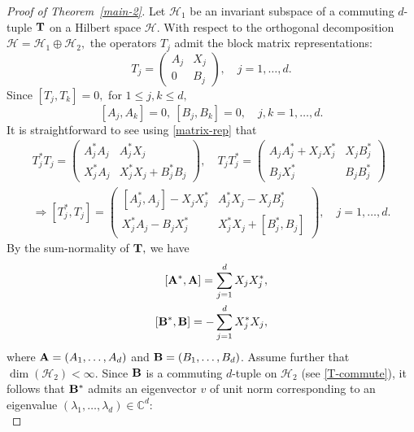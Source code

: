 \documentclass[10pt, a4paper, oneside, reqno]{amsproc}
\numberwithin{equation}{section}
\theoremstyle{remark}
\theoremstyle{definition}
\newcommand*{\Le}{\leqslant}
\begin{document}
\begin{proof}[Proof of Theorem~\ref{main-2}]
Let $\mathcal H_1$ be an invariant subspace of a commuting $d$-tuple ${\bf T}$ on a Hilbert space $\mathcal H$. With respect to the orthogonal decomposition $\mathcal H= \mathcal H_1 \oplus \mathcal H_2,$ the operators $T_j$ admit the block matrix representations: 
\begin{equation} \label{matrix-rep}
T_j=\begin{pmatrix}
A_j & X_j \\
0 & B_j
\end{pmatrix}, \quad j=1,\ldots,d.
\end{equation}
Since $[T_j, T_k]=0,$ for $1 \Le j, k \Le d,$ 
\begin{equation} \label{T-commute}
[A_j, A_k] =  0,~
[B_j, B_k] = 0, \quad
 j, k = 1, \ldots, d.
\end{equation}
It is straightforward to see using \eqref{matrix-rep} that 
\begin{align*}
T_j^* T_j = 
\begin{pmatrix}
A_j^* A_j  & A_j^* X_j  \\[4pt]
X_j^* A_j & X_j^* X_j+ B_j^* B_j
\end{pmatrix},
\quad
T_jT_j^*=\begin{pmatrix}
A_j A_j^* +  X_j  X_j^* &  X_j B_j^* \\[4pt]
B_j X_j^* & B_j B_j^*
\end{pmatrix} \\
\Longrightarrow [T_j^*, T_j] = 
\begin{pmatrix}
[A_j^*, A_j] - X_jX_j^*  & A_j^*X_j-X_jB_j^*  \\[4pt]
X_j^*A_j-B_jX_j^* & X_j^* X_j+ [B_j^*, B_j]
\end{pmatrix}, \quad j=1,\ldots,d.
\end{align*}
By the sum-normality of ${\bf T},$ we have 
\begin{align}\label{0-identity-0}
[{\bf A}^*,{\bf A}]= \sum\limits_{j=1}^d X_jX_j^*,\\
\label{1-identity-1}
[{\bf B}^*,{\bf B}]= -\sum\limits_{j=1}^d X_j^*X_j,
\end{align}
where ${\bf A}=(A_1, \ldots, A_d)$ and ${\bf B}=(B_1, \ldots, B_d)$. 
Assume further that $\dim(\mathcal H_2) < \infty.$ 
Since ${\bf B}$ is a commuting  $d$-tuple on $\mathcal H_2$ (see \eqref{T-commute}), it follows that ${{\bf B}^*}$ admits an eigenvector $v$ of unit norm corresponding to an eigenvalue $(\lambda_1,\ldots, \lambda_d)\in \mathbb C^d$:
\begin{equation} \label{joint-eigen new}

\end{equation}
\end{proof}
\end{document}
